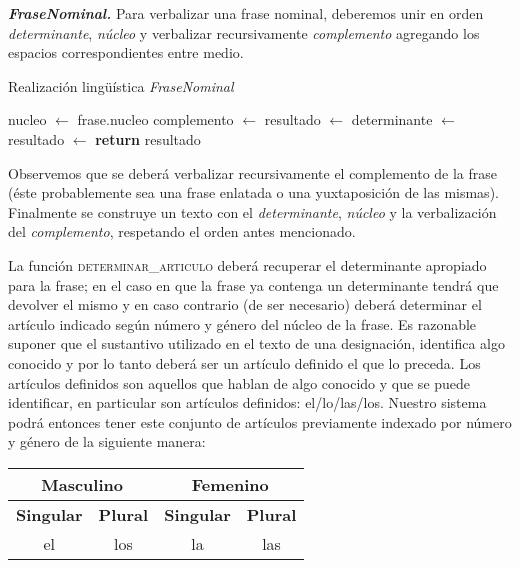 \medskip
\noindent
\textbf{\emph{FraseNominal.}} Para verbalizar una frase nominal, deberemos unir en orden \textit{determinante}, \textit{núcleo} y verbalizar recursivamente \textit{complemento} agregando los espacios correspondientes entre medio.

\begin{algorithm}[H]
\caption{Realización lingüística \textit{FraseNominal}}
\begin{algorithmic}[1]
\State nucleo $\gets$ frase.nucleo
\State complemento $\gets$ 
\State resultado $\gets$ 
\Else
\State determinante $\gets$ 
\State resultado $\gets$ 
\EndIf
\State \textbf{return} resultado
\EndFunction
\end{algorithmic}
\end{algorithm}

\noindent
Observemos que se deberá verbalizar recursivamente el complemento de la frase (éste probablemente sea una frase enlatada o una yuxtaposición de las mismas). Finalmente se construye un texto con el \emph{determinante}, \emph{núcleo} y la verbalización del \emph{complemento}, respetando el orden antes mencionado.

La función \textsc{determinar\_articulo} deberá recuperar el determinante apropiado para la frase; en el caso en que la frase ya contenga un determinante tendrá que devolver el mismo y en caso contrario (de ser necesario) deberá determinar el artículo indicado según número y género del núcleo de la frase. Es razonable suponer que el sustantivo utilizado en el texto de una designación, identifica algo conocido y por lo tanto deberá ser un artículo definido el que lo preceda. Los artículos definidos son aquellos que hablan de algo conocido y que se puede identificar, en particular son artículos definidos: el/lo/las/los. Nuestro sistema podrá entonces tener este conjunto de artículos previamente indexado por número y género de la siguiente manera:

\begin{table}[H]
\centering
\begin{tabular}{|c|c|c|c|}
\hline
\multicolumn{2}{|c|}{\textbf{Masculino}} & \multicolumn{2}{c|}{\textbf{Femenino}} \\ \hline
\textbf{Singular}    & \textbf{Plural}   & \textbf{Singular}   & \textbf{Plural}  \\ \hline
el                   & los               & la                  & las              \\ \hline
\end{tabular}
\end{table}

